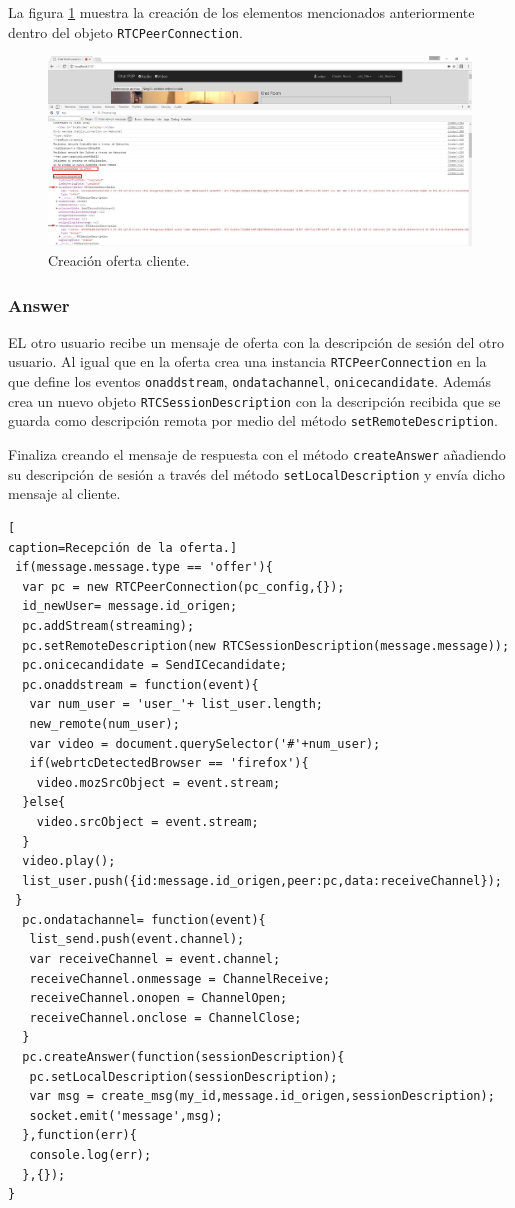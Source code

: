 La figura \ref{fig:OfferCliente} muestra la creación de los elementos mencionados anteriormente dentro del objeto \texttt{RTCPeerConnection}.
\begin{figure}[!h]
\centering
\includegraphics[width=1\linewidth]{Figures/OfferCliente}
\decoRule
\caption[Creación oferta cliente.]{Creación oferta cliente.}
\label{fig:OfferCliente}
\end{figure}

\subsubsection*{Answer}
EL otro usuario recibe un mensaje de oferta con la descripción de sesión del otro usuario. Al igual que en la oferta crea una instancia \texttt{RTCPeerConnection} en la que define los eventos \texttt{onaddstream}, \texttt{ondatachannel}, \texttt{onicecandidate}. Además crea un nuevo objeto \texttt{RTCSessionDescription} con la descripción recibida que se guarda como descripción remota por medio del método \texttt{setRemoteDescription}.

Finaliza creando el mensaje de respuesta con el método \texttt{createAnswer} añadiendo su descripción de sesión a través del método \texttt{setLocalDescription} y envía dicho mensaje al cliente.
\begin{lstlisting}[
caption=Recepción de la oferta.]
 if(message.message.type == 'offer'){
  var pc = new RTCPeerConnection(pc_config,{});
  id_newUser= message.id_origen;
  pc.addStream(streaming);
  pc.setRemoteDescription(new RTCSessionDescription(message.message));
  pc.onicecandidate = SendICecandidate;
  pc.onaddstream = function(event){
   var num_user = 'user_'+ list_user.length;
   new_remote(num_user);
   var video = document.querySelector('#'+num_user);
   if(webrtcDetectedBrowser == 'firefox'){
    video.mozSrcObject = event.stream;
  }else{
    video.srcObject = event.stream;
  }
  video.play();
  list_user.push({id:message.id_origen,peer:pc,data:receiveChannel});
 }
  pc.ondatachannel= function(event){
   list_send.push(event.channel);
   var receiveChannel = event.channel;
   receiveChannel.onmessage = ChannelReceive;
   receiveChannel.onopen = ChannelOpen;
   receiveChannel.onclose = ChannelClose;
  }
  pc.createAnswer(function(sessionDescription){
   pc.setLocalDescription(sessionDescription);
   var msg = create_msg(my_id,message.id_origen,sessionDescription);
   socket.emit('message',msg);
  },function(err){
   console.log(err);
  },{});
}
\end{lstlisting}

